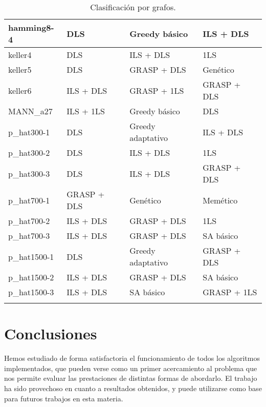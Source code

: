 \begin{small}
\begin{longtable}{l l l l}
    hamming8-4         & DLS & Greedy básico & ILS + DLS  \\  \hline
    keller4            & DLS & ILS + DLS & 1LS  \\  \hline
    keller5            & DLS & GRASP + DLS & Genético  \\  \hline
    keller6            & ILS + DLS & GRASP + 1LS & GRASP + DLS  \\  \hline
    MANN\_a27          & ILS + 1LS & Greedy básico & DLS  \\  \hline
    p\_hat300-1        & DLS & Greedy adaptativo & ILS + DLS  \\  \hline
    p\_hat300-2        & DLS & ILS + DLS & 1LS  \\  \hline
    p\_hat300-3        & DLS & ILS + DLS & GRASP + DLS  \\  \hline
    p\_hat700-1        & GRASP + DLS & Genético & Memético  \\  \hline
    p\_hat700-2        & ILS + DLS & GRASP + DLS & 1LS  \\  \hline
    p\_hat700-3        & ILS + DLS & GRASP + DLS & SA básico  \\  \hline
    p\_hat1500-1       & DLS & Greedy adaptativo & GRASP + DLS  \\  \hline
    p\_hat1500-2       & ILS + DLS & GRASP + DLS & SA básico  \\  \hline
    p\_hat1500-3       & ILS + DLS & SA básico & GRASP + 1LS  \\  \hline
  \caption{Clasificación por grafos.}
\end{longtable}
\end{small}



\section{Conclusiones}

Hemos estudiado de forma satisfactoria el funcionamiento de todos los algoritmos implementados,
que pueden verse como un primer acercamiento al problema que nos permite evaluar las
prestaciones de distintas formas de abordarlo. El trabajo ha sido provechoso en cuanto
a resultados obtenidos, y puede utilizarse como base para futuros trabajos en esta materia.

